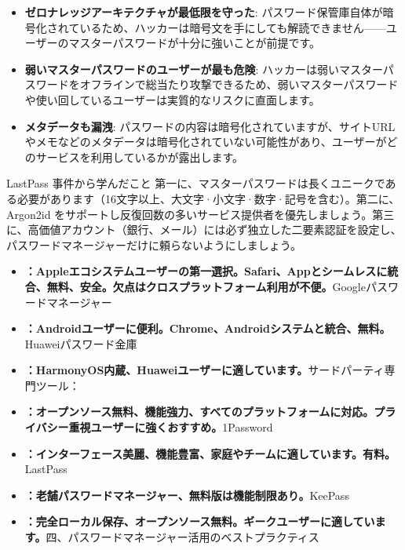 \begin{itemize}
  \item \textbf{ゼロナレッジアーキテクチャが最低限を守った}: パスワード保管庫自体が暗号化されているため、ハッカーは暗号文を手にしても解読できません——ユーザーのマスターパスワードが十分に強いことが前提です。
  \item \textbf{弱いマスターパスワードのユーザーが最も危険}: ハッカーは弱いマスターパスワードをオフラインで総当たり攻撃できるため、弱いマスターパスワードや使い回しているユーザーは実質的なリスクに直面します。
  \item \textbf{メタデータも漏洩}: パスワードの内容は暗号化されていますが、サイトURLやメモなどのメタデータは暗号化されていない可能性があり、ユーザーがどのサービスを利用しているかが露出します。
\end{itemize}

\begin{tcbwarn}{LastPass 事件から学んだこと}
第一に、マスターパスワードは長くユニークである必要があります（16文字以上、大文字·小文字·数字·記号を含む）。第二に、Argon2id をサポートし反復回数の多いサービス提供者を優先しましょう。第三に、高価値アカウント（銀行、メール）には必ず独立した二要素認証を設定し、パスワードマネージャーだけに頼らないようにしましょう。

\end{tcbwarn}



\begin{itemize}
  \item \textbf{：Appleエコシステムユーザーの第一選択。Safari、Appとシームレスに統合、無料、安全。欠点はクロスプラットフォーム利用が不便。}Googleパスワードマネージャー
  \item \textbf{：Androidユーザーに便利。Chrome、Androidシステムと統合、無料。}Huaweiパスワード金庫
  \item \textbf{：HarmonyOS内蔵、Huaweiユーザーに適しています。}サードパーティ専門ツール：
\end{itemize}


\begin{itemize}
  \item \textbf{：オープンソース無料、機能強力、すべてのプラットフォームに対応。プライバシー重視ユーザーに強くおすすめ。}1Password
  \item \textbf{：インターフェース美麗、機能豊富、家庭やチームに適しています。有料。}LastPass
  \item \textbf{：老舗パスワードマネージャー、無料版は機能制限あり。}KeePass
  \item \textbf{：完全ローカル保存、オープンソース無料。ギークユーザーに適しています。}四、パスワードマネージャー活用のベストプラクティス
\end{itemize}

